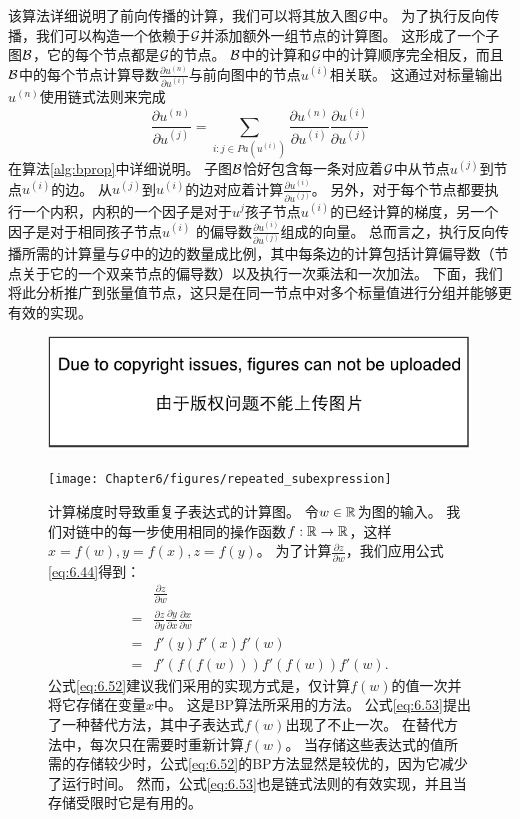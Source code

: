 
该算法详细说明了前向传播的计算，我们可以将其放入图$\mathcal{G}$中。
为了执行反向传播，我们可以构造一个依赖于$\mathcal{G}$并添加额外一组节点的计算图。
这形成了一个子图$\mathcal{B}$，它的每个节点都是$\mathcal{G}$的节点。
$\mathcal{B}$中的计算和$\mathcal{G}$中的计算顺序完全相反，而且$\mathcal{B}$中的每个节点计算导数$\frac{\partial u^{(n)}}{\partial u^{(i)}}$与前向图中的节点$u^{(i)}$相关联。
这通过对标量输出$u^{(n)}$使用链式法则来完成
\begin{equation}
  \frac{\partial u^{(n)}}{\partial u^{(j)}} = \sum_{i:j \in Pa(u^{(i)})} \frac{\partial u^{(n)} }{ \partial u^{(i)} } \frac{ \partial u^{(i)} }{ \partial u^{(j)} }
  \label{eq:6.49}
\end{equation}
在算法\ref{alg:bprop}中详细说明。
子图$\mathcal{B}$恰好包含每一条对应着$\mathcal{G}$中从节点$u^{(j)}$到节点$u^{(i)}$的边。
从$u^{(j)}$到$u^{(i)}$的边对应着计算$\frac{\partial u^{(i)}}{\partial u^{(j)}}$。
另外，对于每个节点都要执行一个内积，内积的一个因子是对于$u^{j}$孩子节点$u^{(i)}$的已经计算的梯度，另一个因子是对于相同孩子节点$u^{(i)}$ 的偏导数$\frac{\partial u^{(i)}}{\partial u^{(j)}}$组成的向量。
总而言之，执行反向传播所需的计算量与$\mathcal{G}$中的边的数量成比例，其中每条边的计算包括计算偏导数（节点关于它的一个双亲节点的偏导数）以及执行一次乘法和一次加法。
下面，我们将此分析推广到张量值节点，这只是在同一节点中对多个标量值进行分组并能够更有效的实现。
\begin{figure}[!htb]
\ifOpenSource
\centerline{\includegraphics{figure.pdf}}
\else
\centerline{\texttt{[image: Chapter6/figures/repeated\_subexpression]}}
\fi
\captionsetup{singlelinecheck=off}
\caption[.]{
计算梯度时导致重复子表达式的计算图。
令$w \in \mathbb{R}$为图的输入。
我们对链中的每一步使用相同的操作函数$f: \mathbb{R} \to \mathbb{R}$，这样$x=f(w), y=f(x), z=f(y)$。
为了计算$\frac{\partial z}{\partial w}$，我们应用公式\ref{eq:6.44}得到：
\begin{align}
& \frac{\partial z}{\partial w}\\
=& \frac{\partial z}{\partial y} \frac{\partial y}{\partial x} \frac{\partial x}{\partial w}\\
\label{eq:6.52}
=& f'(y)f'(x)f'(w)\\ 
\label{eq:6.53}
=& f'(f(f(w))) f'(f(w)) f'(w). 
\end{align}
公式\ref{eq:6.52}建议我们采用的实现方式是，仅计算$f(w)$的值一次并将它存储在变量$x$中。
这是\gls{BP}算法所采用的方法。
公式\ref{eq:6.53}提出了一种替代方法，其中子表达式$f(w)$出现了不止一次。 %
在替代方法中，每次只在需要时重新计算$f(w)$。
当存储这些表达式的值所需的存储较少时，公式\ref{eq:6.52}的\gls{BP}方法显然是较优的，因为它减少了运行时间。
然而，公式\ref{eq:6.53}也是链式法则的有效实现，并且当存储受限时它是有用的。}
\label{fig:chap6_repeated_subexpression}
\end{figure}

